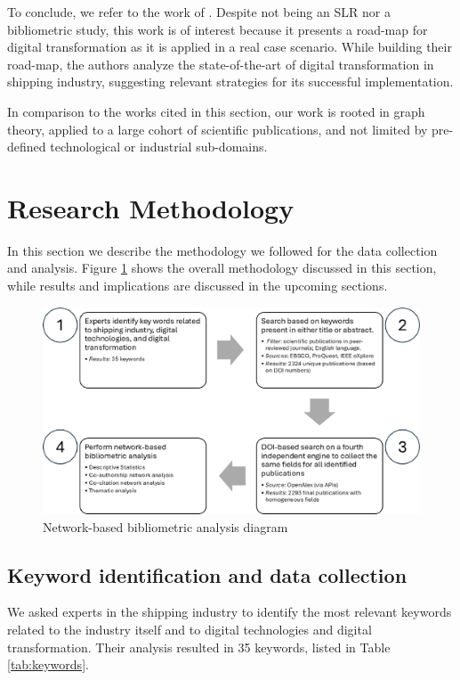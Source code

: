 \documentclass[a4paper, review, endfloat, doubleblind, authoryear]{elsarticle}
\begin{document}
	To conclude, we refer to the work of \citep{filippopoulos2022road}. Despite not being an SLR nor a bibliometric study, this work is of interest because it presents a road-map for digital transformation as it is applied in a real case scenario. While building their road-map, the authors analyze the state-of-the-art of digital transformation in shipping industry, suggesting relevant strategies for its successful implementation.
	
	In comparison to the works cited in this section, our work is rooted in graph theory, applied to a large cohort of scientific publications, and not limited by pre-defined technological or industrial sub-domains.
	
	\section{Research Methodology}
	In this section we describe the methodology we followed for the data collection and analysis. Figure \ref{fig:fig0} shows the overall methodology discussed in this section, while results and implications are discussed in the upcoming sections.
	
	\begin{figure}[htbp]
		\centering
		\includegraphics[width=\linewidth]{pics/overall_diagram.eps}
		\caption{Network-based bibliometric analysis diagram}\label{fig:fig0}
	\end{figure}
	
	\subsection{Keyword identification and data collection}
	We asked experts in the shipping industry to identify the most relevant keywords related to the industry itself and to digital technologies and digital transformation. Their analysis resulted in 35 keywords, listed in Table \ref{tab:keywords}.
	
\end{document}
